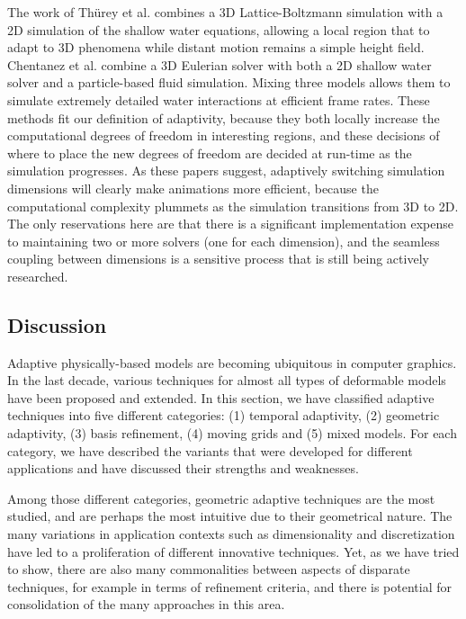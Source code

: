 The work of Th\"urey et al. \cite{Thurey2006:Coupling} combines a 3D Lattice-Boltzmann simulation with a 2D simulation of the shallow water equations, allowing a local region that to adapt to 3D phenomena while distant motion remains a simple height field. Chentanez et al. \cite{Chentanez2014} combine a 3D Eulerian solver with both a 2D shallow water solver and a particle-based fluid simulation. Mixing three models allows them to simulate extremely detailed water interactions at efficient frame rates. These methods fit our definition of adaptivity, because they both locally increase the computational degrees of freedom in interesting regions, and these decisions of where to place the new degrees of freedom are decided at run-time as the simulation progresses. As these papers suggest, adaptively switching simulation dimensions will clearly make animations more efficient, because the computational complexity plummets as the simulation transitions from 3D to 2D. The only reservations here are that there is a significant implementation expense to maintaining two or more solvers (one for each dimension), and the seamless coupling between dimensions is a sensitive process that is still being actively researched.

\subsection{Discussion} \label{sec conclusion}
Adaptive physically-based models are becoming ubiquitous in computer graphics.
In the last decade, various techniques for almost all types of deformable models have been proposed and extended.
In this section, we have classified adaptive techniques into five different categories: (1) temporal adaptivity, (2) geometric adaptivity, (3) basis refinement, (4) moving grids and (5) mixed models.
For each category, we have described the variants that were developed for different applications and have discussed their strengths and weaknesses.

Among those different categories, geometric adaptive techniques are the most studied, and are perhaps the most intuitive due to their geometrical nature.
The many variations in application contexts such as dimensionality and discretization have led to a proliferation of different innovative techniques.
Yet, as we have tried to show, there are also many commonalities between aspects of disparate techniques, for example in terms of refinement criteria, and there is potential for consolidation of the many approaches in this area.

